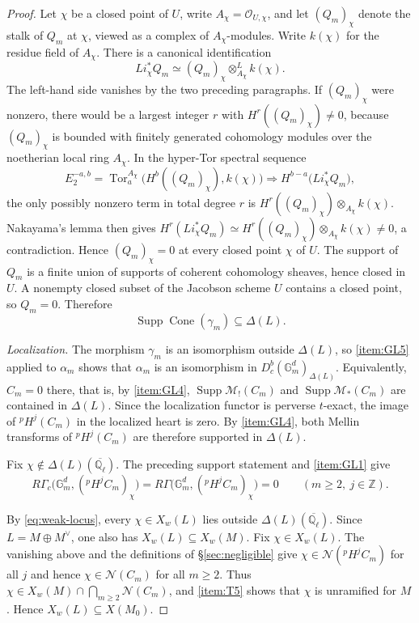 \documentclass[12pt,reqno]{amsart}
\theoremstyle{definition}
\theoremstyle{plain}
\theoremstyle{definition}
\theoremstyle{remark}
\newcommand{\bbG}{\mathbb{G}}  \newcommand{\bbH}{\mathbb{H}}
\newcommand{\bbQ}{\mathbb{Q}}  \newcommand{\bbR}{\mathbb{R}}
\newcommand{\ol}[1]{\overline{#1}}
\newcommand{\Ql}{\bbQ_{\ell}}
\DeclareMathOperator{\Tor}{Tor}
\newcommand{\Db}{D^b_c}
\newcommand{\Gm}{\bbG_m}
\newcommand{\Supp}{\operatorname{Supp}}
\newcommand{\Cone}{\operatorname{Cone}}
\begin{document}
\begin{proof}
Let \(\chi\) be a closed point of \(U\), write \(A_\chi=\mathcal O_{U,\chi}\), and let
\((Q_m)_\chi\) denote the stalk of \(Q_m\) at \(\chi\), viewed as a complex of \(A_\chi\)-modules.
Write \(k(\chi)\) for the residue field of \(A_\chi\).  There is a canonical identification
\[
        Li_\chi^*Q_m\simeq (Q_m)_\chi\otimes^L_{A_\chi}k(\chi).
\]
The left-hand side vanishes by the two preceding paragraphs.
If \((Q_m)_\chi\) were nonzero, there would be a largest integer \(r\) with
\(H^r((Q_m)_\chi)\neq0\), because \((Q_m)_\chi\) is bounded with finitely generated cohomology
modules over the noetherian local ring \(A_\chi\).  In the hyper-Tor spectral sequence
\[
 E_2^{-a,b}=\Tor^{A_\chi}_a\bigl(H^b((Q_m)_\chi),k(\chi)\bigr)
 \Longrightarrow H^{b-a}\bigl(Li_\chi^*Q_m\bigr),
\]
the only possibly nonzero term in total degree \(r\) is \(H^r((Q_m)_\chi)\otimes_{A_\chi}k(\chi)\).
Nakayama's lemma then gives
\(H^r(Li_\chi^*Q_m)\simeq H^r((Q_m)_\chi)\otimes_{A_\chi}k(\chi)\neq0\), a contradiction.  Hence
\((Q_m)_\chi=0\) at every closed point \(\chi\) of \(U\).  The support of \(Q_m\) is a finite union
of supports of coherent cohomology sheaves, hence closed in \(U\).  A nonempty closed subset of the
Jacobson scheme \(U\) contains a closed point, so \(Q_m=0\).  Therefore
\[
        \Supp\Cone(\gamma_m)\subseteq\Delta(L).
\]

\emph{Localization.}  The morphism \(\gamma_m\) is an isomorphism outside \(\Delta(L)\), so \ref{item:GL5}
applied to \(\alpha_m\) shows that \(\alpha_m\) is an isomorphism in \(\Db(\Gm^d)_{\Delta(L)}\).
Equivalently, \(C_m=0\) there, that is, by \ref{item:GL4}, \(\Supp\mathscr M_!(C_m)\) and
\(\Supp\mathscr M_*(C_m)\) are contained in \(\Delta(L)\).  Since the localization functor is perverse
\(t\)-exact, the image of \({}^pH^j(C_m)\) in the localized heart is zero.  By \ref{item:GL4}, both Mellin
transforms of \({}^pH^j(C_m)\) are therefore supported in \(\Delta(L)\).

Fix \(\chi\notin\Delta(L)(\ol\Ql)\).  The preceding support statement and \ref{item:GL1} give
\[
        R\Gamma_c\bigl(\Gm^d,({}^pH^jC_m)_\chi\bigr)
        =R\Gamma\bigl(\Gm^d,({}^pH^jC_m)_\chi\bigr)=0
        \qquad(m\ge2,\ j\in\mathbb Z).
\]

By \eqref{eq:weak-locus}, every \(\chi\in X_w(L)\) lies outside \(\Delta(L)(\ol\Ql)\).  Since
\(L=M\oplus M^\vee\), one also has \(X_w(L)\subseteq X_w(M)\).  Fix \(\chi\in X_w(L)\).  The vanishing
above and the definitions of \S\ref{sec:negligible} give \(\chi\in\mathcal N({}^pH^jC_m)\) for all
\(j\) and hence \(\chi\in\mathcal N(C_m)\) for all \(m\ge2\).  Thus
\(\chi\in X_w(M)\cap\bigcap_{m\ge2}\mathcal N(C_m)\), and \ref{item:T5} shows that \(\chi\) is
unramified for \(M\).  Hence \(X_w(L)\subseteq X(M_0)\).
\end{proof}
\end{document}
